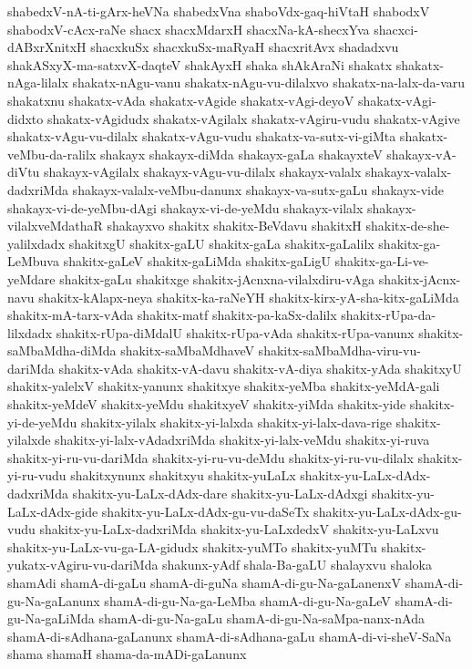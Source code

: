 {shabedxV-nA-ti-gArx-heVNa
shabedxVna
shaboVdx-gaq-hiVtaH
shabodxV
shabodxV-cAcx-raNe
shacx
shacxMdarxH
shacxNa-kA-shecxYva
shacxci-dABxrXnitxH
shacxkuSx
shacxkuSx-maRyaH
shacxritAvx
shadadxvu
shakASxyX-ma-satxvX-daqteV
shakAyxH
shaka
shAkAraNi
shakatx
shakatx-nAga-lilalx
shakatx-nAgu-vanu
shakatx-nAgu-vu-dilalxvo
shakatx-na-lalx-da-varu
shakatxnu
shakatx-vAda
shakatx-vAgide
shakatx-vAgi-deyoV
shakatx-vAgi-didxto
shakatx-vAgidudx
shakatx-vAgilalx
shakatx-vAgiru-vudu
shakatx-vAgive
shakatx-vAgu-vu-dilalx
shakatx-vAgu-vudu
shakatx-va-sutx-vi-giMta
shakatx-veMbu-da-ralilx
shakayx
shakayx-diMda
shakayx-gaLa
shakayxteV
shakayx-vA-diVtu
shakayx-vAgilalx
shakayx-vAgu-vu-dilalx
shakayx-valalx
shakayx-valalx-dadxriMda
shakayx-valalx-veMbu-danunx
shakayx-va-sutx-gaLu
shakayx-vide
shakayx-vi-de-yeMbu-dAgi
shakayx-vi-de-yeMdu
shakayx-vilalx
shakayx-vilalxveMdathaR
shakayxvo
shakitx
shakitx-BeVdavu
shakitxH
shakitx-de-she-yalilxdadx
shakitxgU
shakitx-gaLU
shakitx-gaLa
shakitx-gaLalilx
shakitx-ga-LeMbuva
shakitx-gaLeV
shakitx-gaLiMda
shakitx-gaLigU
shakitx-ga-Li-ve-yeMdare
shakitx-gaLu
shakitxge
shakitx-jAcnxna-vilalxdiru-vAga
shakitx-jAcnx-navu
shakitx-kAlapx-neya
shakitx-ka-raNeYH
shakitx-kirx-yA-sha-kitx-gaLiMda
shakitx-mA-tarx-vAda
shakitx-matf
shakitx-pa-kaSx-dalilx
shakitx-rUpa-da-lilxdadx
shakitx-rUpa-diMdalU
shakitx-rUpa-vAda
shakitx-rUpa-vanunx
shakitx-saMbaMdha-diMda
shakitx-saMbaMdhaveV
shakitx-saMbaMdha-viru-vu-dariMda
shakitx-vAda
shakitx-vA-davu
shakitx-vA-diya
shakitx-yAda
shakitxyU
shakitx-yalelxV
shakitx-yanunx
shakitxye
shakitx-yeMba
shakitx-yeMdA-gali
shakitx-yeMdeV
shakitx-yeMdu
shakitxyeV
shakitx-yiMda
shakitx-yide
shakitx-yi-de-yeMdu
shakitx-yilalx
shakitx-yi-lalxda
shakitx-yi-lalx-dava-rige
shakitx-yilalxde
shakitx-yi-lalx-vAdadxriMda
shakitx-yi-lalx-veMdu
shakitx-yi-ruva
shakitx-yi-ru-vu-dariMda
shakitx-yi-ru-vu-deMdu
shakitx-yi-ru-vu-dilalx
shakitx-yi-ru-vudu
shakitxynunx
shakitxyu
shakitx-yuLaLx
shakitx-yu-LaLx-dAdx-dadxriMda
shakitx-yu-LaLx-dAdx-dare
shakitx-yu-LaLx-dAdxgi
shakitx-yu-LaLx-dAdx-gide
shakitx-yu-LaLx-dAdx-gu-vu-daSeTx
shakitx-yu-LaLx-dAdx-gu-vudu
shakitx-yu-LaLx-dadxriMda
shakitx-yu-LaLxdedxV
shakitx-yu-LaLxvu
shakitx-yu-LaLx-vu-ga-LA-gidudx
shakitx-yuMTo
shakitx-yuMTu
shakitx-yukatx-vAgiru-vu-dariMda
shakunx-yAdf
shala-Ba-gaLU
shalayxvu
shaloka
shamAdi
shamA-di-gaLu
shamA-di-guNa
shamA-di-gu-Na-gaLanenxV
shamA-di-gu-Na-gaLanunx
shamA-di-gu-Na-ga-LeMba
shamA-di-gu-Na-gaLeV
shamA-di-gu-Na-gaLiMda
shamA-di-gu-Na-gaLu
shamA-di-gu-Na-saMpa-nanx-nAda
shamA-di-sAdhana-gaLanunx
shamA-di-sAdhana-gaLu
shamA-di-vi-sheV-SaNa
shama
shamaH
shama-da-mADi-gaLanunx
}
